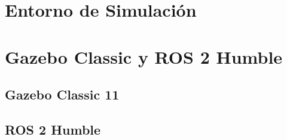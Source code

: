 \section{Entorno de Simulación}
\section{Gazebo Classic y ROS 2 Humble}
\subsection{Gazebo Classic 11}
\subsection{ROS 2 Humble}
